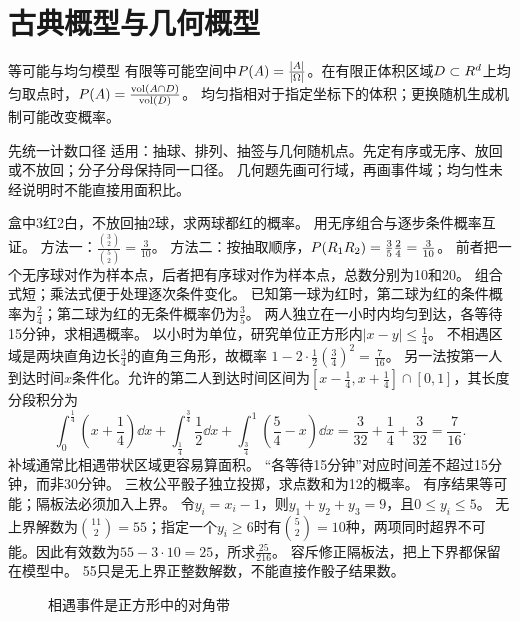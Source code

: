 \section{古典概型与几何概型}\label{sec:12}
\begin{definition}{等可能与均匀模型}
有限等可能空间中$P(A)=\frac{|A|}{|\Omega|}$。在有限正体积区域$D\subset R^d$上均匀取点时，$P(A)=\frac{\operatorname{vol}(A\cap D)}{\operatorname{vol}(D)}$。
均匀指相对于指定坐标下的体积；更换随机生成机制可能改变概率。
\end{definition}
\begin{method}{先统一计数口径}
适用：抽球、排列、抽签与几何随机点。先定有序或无序、放回或不放回；分子分母保持同一口径。
几何题先画可行域，再画事件域；均匀性未经说明时不能直接用面积比。
\end{method}
{盒中3红2白，不放回抽2球，求两球都红的概率。}
{用无序组合与逐步条件概率互证。}
{方法一：$\frac{\binom32}{\binom52}=\frac{3}{10}$。
方法二：按抽取顺序，$P(R_1R_2)=\frac35\frac24=\frac{3}{10}$。
前者把一个无序球对作为样本点，后者把有序球对作为样本点，总数分别为10和20。}
{组合式短；乘法式便于处理逐次条件变化。}
{已知第一球为红时，第二球为红的条件概率为$\frac{2}{4}$；第二球为红的无条件概率仍为$\frac{3}{5}$。}
{两人独立在一小时内均匀到达，各等待15分钟，求相遇概率。}
{以小时为单位，研究单位正方形内$|x-y|\le\frac{1}{4}$。}
{不相遇区域是两块直角边长$\frac{3}{4}$的直角三角形，故概率
$1-2\cdot\frac12(\frac{3}{4})^2=\frac{7}{16}$。
另一法按第一人到达时间$x$条件化。允许的第二人到达时间区间为$[x-\frac{1}{4},x+\frac{1}{4}]\cap[0,1]$，其长度分段积分为
\[\int_0^{\frac{1}{4}}(x+\dfrac{1}{4})\dd x+\int_{\frac{1}{4}}^{\frac{3}{4}}\dfrac12\dd x+
\int_{\frac{3}{4}}^1(\dfrac{5}{4}-x)\dd x=\dfrac3{32}+\dfrac14+\dfrac3{32}=\dfrac7{16}.\]}
{补域通常比相遇带状区域更容易算面积。}
{“各等待15分钟”对应时间差不超过15分钟，而非30分钟。}
{三枚公平骰子独立投掷，求点数和为12的概率。}
{有序结果等可能；隔板法必须加入上界。}
{令$y_i=x_i-1$，则$y_1+y_2+y_3=9$，且$0\le y_i\le5$。
无上界解数为$\binom{11}{2}=55$；指定一个$y_i\ge6$时有$\binom52=10$种，两项同时超界不可能。因此有效数为$55-3\cdot10=25$，所求$\frac{25}{216}$。}
{容斥修正隔板法，把上下界都保留在模型中。}
{55只是无上界正整数解数，不能直接作骰子结果数。}
\begin{figure}[htbp]\centering
{}\caption{相遇事件是正方形中的对角带}\label{fig:meeting}\end{figure}


